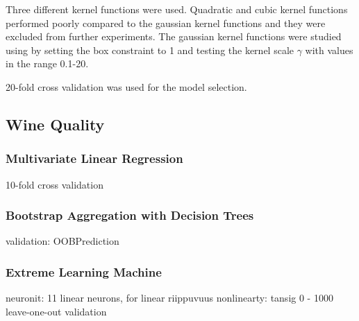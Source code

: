 Three different kernel functions were used. Quadratic and cubic kernel functions performed poorly compared to the gaussian kernel functions and they were excluded from further experiments. The gaussian kernel functions were studied using by setting the box constraint to 1 and testing the kernel scale $\gamma$ with values in the range 0.1-20.

20-fold cross validation was used for the model selection.

\subsection{Wine Quality}
\subsubsection{Multivariate Linear Regression}
10-fold cross validation

\subsubsection{Bootstrap Aggregation with Decision Trees}
validation: OOBPrediction
\subsubsection{Extreme Learning Machine}
neuronit: 11 linear neurons, for linear riippuvuus
nonlinearty: tansig 0 - 1000
leave-one-out validation




